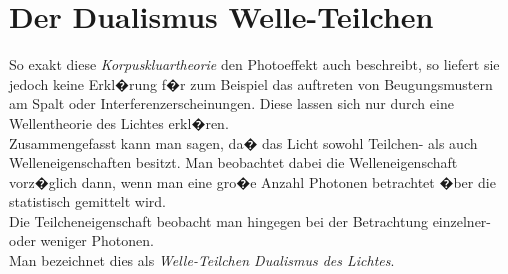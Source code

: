 \documentclass[a4paper, 10pt]{report}%
\begin{document}
\section{Der Dualismus Welle-Teilchen}
So exakt diese \textit{Korpuskluartheorie} den Photoeffekt auch beschreibt, so liefert sie jedoch keine Erkl�rung f�r zum Beispiel das auftreten von Beugungsmustern am Spalt oder Interferenzerscheinungen. Diese lassen sich nur durch eine Wellentheorie des Lichtes erkl�ren.\\
Zusammengefasst kann man sagen, da� das Licht sowohl Teilchen- als auch Welleneigenschaften besitzt. Man beobachtet dabei die Welleneigenschaft vorz�glich dann, wenn man eine gro�e Anzahl Photonen betrachtet �ber die statistisch gemittelt wird.\\
Die Teilcheneigenschaft beobacht man hingegen bei der Betrachtung einzelner- oder weniger Photonen.\\
Man bezeichnet dies als \textit{Welle-Teilchen Dualismus des Lichtes}.
\end{document}
